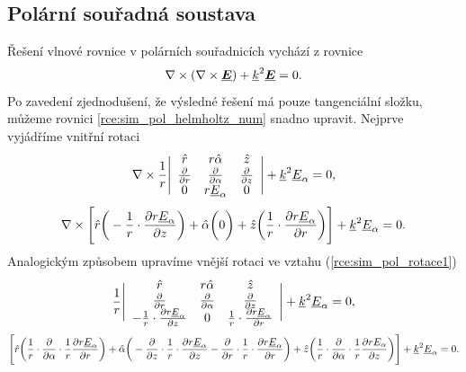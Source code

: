 \subsection{Polární souřadná soustava}
Řešení vlnové rovnice v polárních souřadnicích vychází z rovnice
\begin{equation}
	\nabla\times(\nabla\times\mbox{\underline{\boldmath$E$}}) +{\underline{k}}^{2}\mbox{\underline{\boldmath$E$}} = 0.
	\label{rce:sim_pol_helmholtz_num} 
\end{equation}
Po zavedení zjednodušení, že výsledné řešení má pouze tangenciální složku, můžeme rovnici \ref{rce:sim_pol_helmholtz_num} snadno upravit. Nejprve vyjádříme vnitřní rotaci
\begin{displaymath}
	\nabla\times \frac{1}{r}\Bigg|
	\begin{array}{ccc}
\hat{r} & r\hat{\alpha} & \hat{z} \\
\frac{\partial}{\partial r} & \frac{\partial}{\partial \alpha} & \frac{\partial}{\partial z} \\
0 & r{\underline{E}}_{\alpha} & 0\\
\end{array}\Bigg| +{\underline{k}}^{2}{\underline{E}}_{\alpha} = 0,
\end{displaymath}
\begin{equation}
\nabla\times \Bigg[\hat{r}\bigg(-\frac{1}{r}\cdot\frac{\partial r{\underline{E}}_{\alpha}}{\partial z}\bigg) + \hat{\alpha}\bigg(0\bigg) + \hat{z}\bigg(\frac{1}{r}\cdot\frac{\partial r{\underline{E}}_{\alpha}}{\partial r}\bigg) \Bigg]+{\underline{k}}^{2}{\underline{E}}_{\alpha} = 0.
	\label{rce:sim_pol_rotace1}
\end{equation}
Analogickým způsobem upravíme vnější rotaci ve vztahu (\ref{rce:sim_pol_rotace1})
\begin{displaymath}
	\frac{1}{r}\Bigg|
	\begin{array}{ccc}
\hat{r} & r\hat{\alpha} & \hat{z} \\
\frac{\partial}{\partial r} & \frac{\partial}{\partial \alpha} & \frac{\partial}{\partial z} \\
-\frac{1}{r}\cdot\frac{\partial r{\underline{E}}_{\alpha}}{\partial z} & 0 & \frac{1}{r}\cdot\frac{\partial r{\underline{E}}_{\alpha}}{\partial r}\\
\end{array}\Bigg| +{\underline{k}}^{2}{\underline{E}}_{\alpha} = 0,
\end{displaymath}
\begin{equation}
\Bigg[\hat{r}\bigg(\frac{1}{r}\cdot\frac{\partial}{\partial \alpha}\cdot\frac{1}{r}\frac{\partial r{\underline{E}}_{\alpha}}{\partial r}\bigg) + \hat{\alpha}\bigg(-\frac{\partial}{\partial z}\cdot\frac{1}{r}\cdot\frac{\partial r{\underline{E}}_{\alpha}}{\partial z} - \frac{\partial}{\partial r}\cdot\frac{1}{r}\cdot\frac{\partial r{\underline{E}}_{\alpha}}{\partial r}\bigg) + \hat{z}\bigg(\frac{1}{r}\cdot\frac{\partial}{\partial \alpha}\cdot\frac{1}{r}\frac{\partial r E_{\alpha}}{\partial z}\bigg) \Bigg]+{\underline{k}}^{2}{\underline{E}}_{\alpha} = 0.
	\label{rce:sim_pol_rotace2}
\end{equation}
